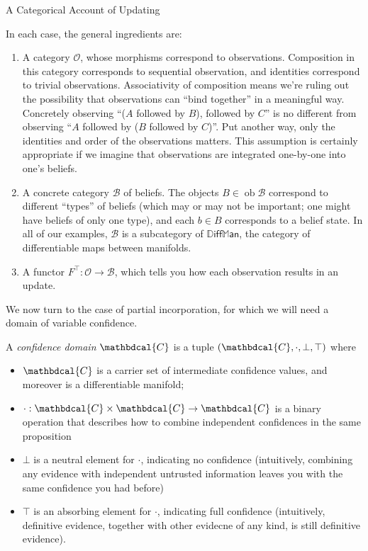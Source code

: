 \documentclass{article}
\newcommand\confdom{\mathbdcal{C}}
\DeclareMathOperator{\ob}{\mathrm{ob}}
\newcommand\B{\mathcal{B}}
\newcommand\Ob{\mathcal{O}}
\newcommand\DiffMan{\mathbb{D}\mathsf{iff}\mathbb{M}\mathsf{an}}
\theoremstyle{plain}
\theoremstyle{definition}
\begin{document}
    \begin{center}
        \Huge
        A Categorical Account of Updating
        \bigskip
    \end{center}
    
    In each case, the general ingredients are:
    \begin{enumerate}
        \item A category $\Ob$, whose morphisms correspond to observations.
        Composition in this category corresponds to sequential observation, and identities correspond to trivial observations.
        Associativity of composition means we're ruling out the possibility that observations can ``bind together'' in a meaningful way.
        Concretely observing ``($A$ followed by $B$), followed by $C$'' is no different from observing ``$A$ followed by ($B$ followed by $C$)''. 
        Put another way, only the identities and order of the observations matters. 
        This assumption is certainly appropriate if we imagine that observations are integrated one-by-one into one's beliefs.
         
        \item A concrete category $\B$ of beliefs.
        The objects $B \in \ob \B$ correspond to different ``types'' of beliefs (which may or may not be important; one might have beliefs of only one type),
        and each $b \in B$ corresponds to a belief state. 
        In all of our examples, $\B$ is a subcategory of $\DiffMan$, the category of differentiable maps between manifolds. 
        
        \item A functor $F^\top : \Ob \to \B$, which tells you how each observation results in an update. 
        
    \end{enumerate}
    We now turn to the case of partial incorporation, for which we will need a domain of variable confidence.
    \begin{defn}
        A \emph{confidence domain} $\confdom$ is a tuple 
        $(\confdom, \cdot, \bot, \top)$
        where
        \begin{itemize}[nosep]
            \item $\confdom$ is a carrier set of intermediate confidence values, and moreover is a differentiable manifold;
            \item $\cdot : \confdom \times \confdom \to \confdom$ is a binary operation that describes how to combine independent confidences in the same proposition
            \item $\bot$ is a neutral element for $\cdot$, indicating no confidence
             (intuitively, combining any evidence with independent untrusted information leaves you with the same confidence you had before)
            \item $\top$ is an absorbing element for $\cdot$, indicating full confidence 
             (intuitively, definitive evidence, together with other evidecne of any kind, is still definitive evidence). 
        \end{itemize}
    \end{defn}
    
\end{document}
